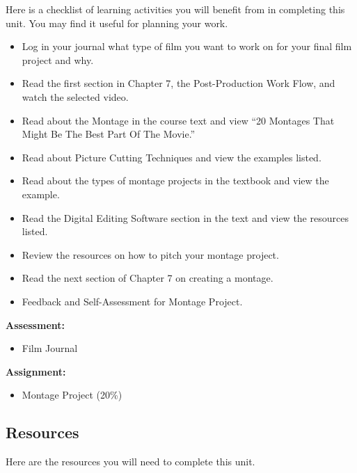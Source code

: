 \documentclass[
]{book}
\providecommand{\tightlist}{%
  \setlength{\itemsep}{0pt}\setlength{\parskip}{0pt}}
\begin{document}
\begin{reflect}
Here is a checklist of learning activities you will benefit from in completing this unit. You may find it useful for planning your work.

\begin{itemize}
\tightlist
\item
  Log in your journal what type of film you want to work on for your final film project and why.
\item
  Read the first section in Chapter 7, the Post-Production Work Flow, and watch the selected video.
\item
  Read about the Montage in the course text and view ``20 Montages That Might Be The Best Part Of The Movie.''
\item
  Read about Picture Cutting Techniques and view the examples listed.
\item
  Read about the types of montage projects in the textbook and view the example.
\item
  Read the Digital Editing Software section in the text and view the resources listed.
\item
  Review the resources on how to pitch your montage project.
\item
  Read the next section of Chapter 7 on creating a montage.
\item
  Feedback and Self-Assessment for Montage Project.
\end{itemize}

\textbf{Assessment:}

\begin{itemize}
\tightlist
\item
  Film Journal
\end{itemize}

\textbf{Assignment:}

\begin{itemize}
\tightlist
\item
  Montage Project (20\%)
\end{itemize}
\end{reflect}

\hypertarget{resources-6}{%
\subsection*{Resources}\label{resources-6}}

Here are the resources you will need to complete this unit.
\end{document}
